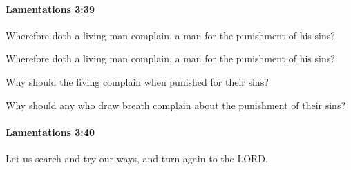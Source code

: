 		\paragraph{Lamentations 3:39} %
			\label{LAMENTATIONS-3-39}

			Wherefore doth a living man complain, a man for the punishment of his sins?

			\begin{versebox}
					\item[BHS] 
					\item[LXX] 
					\item[ASV] Wherefore doth a living man complain, a man for the punishment of his sins?
					\item[NIV] Why should the living complain when punished for their sins?
					\item[NRSV] Why should any who draw breath complain about the punishment of their sins?
			\end{versebox}

		\paragraph{Lamentations 3:40} %
			\label{LAMENTATIONS-3-40}

			Let us search and try our ways, and turn again to the LORD.


